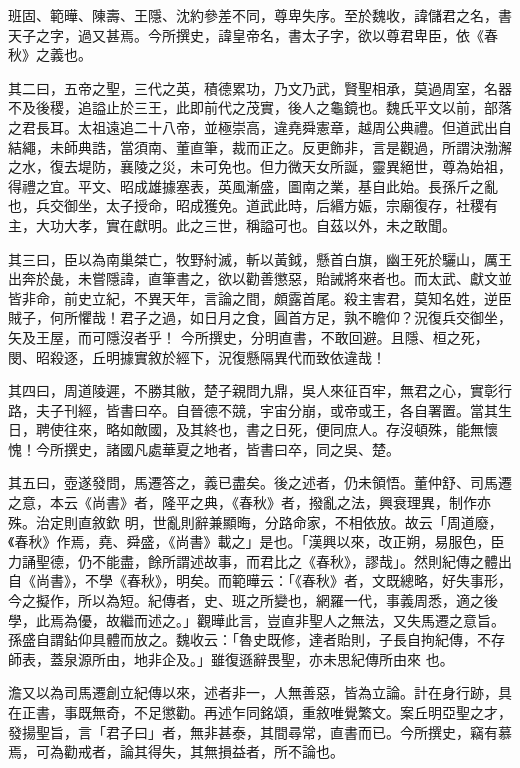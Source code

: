 \begin{pinyinscope}
 班固、範曄、陳壽、王隱、沈約參差不同，尊卑失序。至於魏收，諱儲君之名，書天子之字，過又甚焉。今所撰史，諱皇帝名，書太子字，欲以尊君卑臣，依《春秋》之義也。



 其二曰，五帝之聖，三代之英，積德累功，乃文乃武，賢聖相承，莫過周室，名器不及後稷，追謚止於三王，此即前代之茂實，後人之龜鏡也。魏氏平文以前，部落之君長耳。太祖遠追二十八帝，並極崇高，違堯舜憲章，越周公典禮。但道武出自結繩，未師典誥，當須南、董直筆，裁而正之。反更飾非，言是觀過，所謂決渤澥之水，復去堤防，襄陵之災，未可免也。但力微天女所誕，靈異絕世，尊為始祖，
 得禮之宜。平文、昭成雄據塞表，英風漸盛，圖南之業，基自此始。長孫斤之亂也，兵交御坐，太子授命，昭成獲免。道武此時，后緡方娠，宗廟復存，社稷有主，大功大孝，實在獻明。此之三世，稱謚可也。自茲以外，未之敢聞。



 其三曰，臣以為南巢桀亡，牧野紂滅，斬以黃鉞，懸首白旗，幽王死於驪山，厲王出奔於彘，未嘗隱諱，直筆書之，欲以勸善懲惡，貽誡將來者也。而太武、獻文並皆非命，前史立紀，不異天年，言論之間，頗露首尾。殺主害君，莫知名姓，逆臣賊子，何所懼哉！君子之過，如日月之食，圓首方足，孰不瞻仰？況復兵交御坐，矢及王屋，而可隱沒者乎！
 今所撰史，分明直書，不敢回避。且隱、桓之死，閔、昭殺逐，丘明據實敘於經下，況復懸隔異代而致依違哉！



 其四曰，周道陵遲，不勝其敝，楚子親問九鼎，吳人來征百牢，無君之心，實彰行路，夫子刊經，皆書曰卒。自晉德不競，宇宙分崩，或帝或王，各自署置。當其生日，聘使往來，略如敵國，及其終也，書之日死，便同庶人。存沒頓殊，能無懷愧！今所撰史，諸國凡處華夏之地者，皆書曰卒，同之吳、楚。



 其五曰，壺遂發問，馬遷答之，義已盡矣。後之述者，仍未領悟。董仲舒、司馬遷之意，本云《尚書》者，隆平之典，《春秋》者，撥亂之法，興衰理異，制作亦殊。治定則直敘欽
 明，世亂則辭兼顯晦，分路命家，不相依放。故云「周道廢，《春秋》作焉，堯、舜盛，《尚書》載之」是也。「漢興以來，改正朔，易服色，臣力誦聖德，仍不能盡，餘所謂述故事，而君比之《春秋》，謬哉」。然則紀傳之體出自《尚書》，不學《春秋》，明矣。而範曄云：「《春秋》者，文既總略，好失事形，今之擬作，所以為短。紀傳者，史、班之所變也，網羅一代，事義周悉，適之後學，此焉為優，故繼而述之。」觀曄此言，豈直非聖人之無法，又失馬遷之意旨。孫盛自謂鉆仰具體而放之。魏收云：「魯史既修，達者貽則，子長自拘紀傳，不存師表，蓋泉源所由，地非企及。」雖復遜辭畏聖，亦未思紀傳所由來
 也。



 澹又以為司馬遷創立紀傳以來，述者非一，人無善惡，皆為立論。計在身行跡，具在正書，事既無奇，不足懲勸。再述乍同銘頌，重敘唯覺繁文。案丘明亞聖之才，發揚聖旨，言「君子曰」者，無非甚泰，其間尋常，直書而已。今所撰史，竊有慕焉，可為勸戒者，論其得失，其無損益者，所不論也。




\end{pinyinscope}
